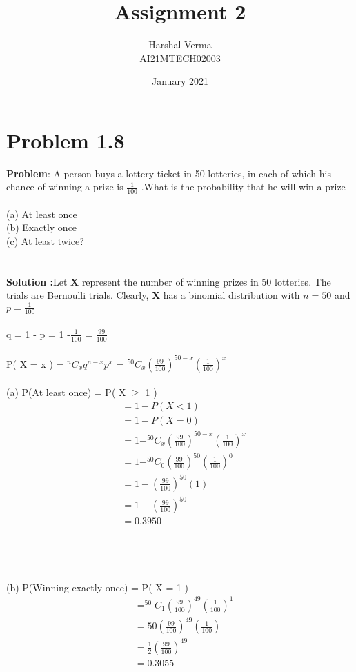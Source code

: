 \documentclass[journal,12pt,twocolumn]{IEEEtran}
\title{Assignment 2}
\author{Harshal Verma\\
AI21MTECH02003}
\date{January 2021}
\begin{document}
\maketitle
\section{Problem 1.8}
\textbf{Problem}: A person buys a lottery ticket in 50 lotteries,
in each of which his chance of winning a
prize is $\frac{1}{100}$ .What is the probability that he will
win a prize\\
\\
(a) At least once\\
(b) Exactly once\\
(c) At least twice?\\
\\
\\
\textbf{Solution :}Let \textbf{X} represent the number of winning prizes in 50 lotteries. The trials are Bernoulli trials.
Clearly, \textbf{X}  has a binomial distribution with 
$n=50$ and $p= \frac{1}{100}$ \\
\\
q = 1 - p = 1 -$\frac{1}{100}$ = $\frac{99}{100}$\\
\\
P( X = x ) = $^{n}C_x q^{n-x} p^x $ = $^{50}C_x (\frac{99}{100})^{50-x} (\frac{1}{100})^x $\\
\\
(a) P(At least once) = P( X $\geq  $ 1 )\\
\begin{align*} 
&= 1-P( X < 1 )\\
&= 1-P( X = 0 )\\
&= 1-^{50}C_x (\frac{99}{100})^{50-x}(\frac{1}{100})^x\\
&= 1-^{50}C_0 (\frac{99}{100})^{50} (\frac{1}{100})^0\\
&=1-(\frac{99}{100})^{50} (1) \\
&=1-(\frac{99}{100})^{50}\\
&=0.3950
\end{align*}
\\
\\
\\
\\
(b) P(Winning exactly once) = P( X = 1 )\\
\begin{align*} 
&= ^{50}C_1 (\frac{99}{100})^{49} (\frac{1}{100})^1\\
&=50(\frac{99}{100})^{49} (\frac{1}{100}) \\
&=\frac{1}{2}(\frac{99}{100})^{49}\\
&=0.3055\\
\end{align*}
\end{document}
